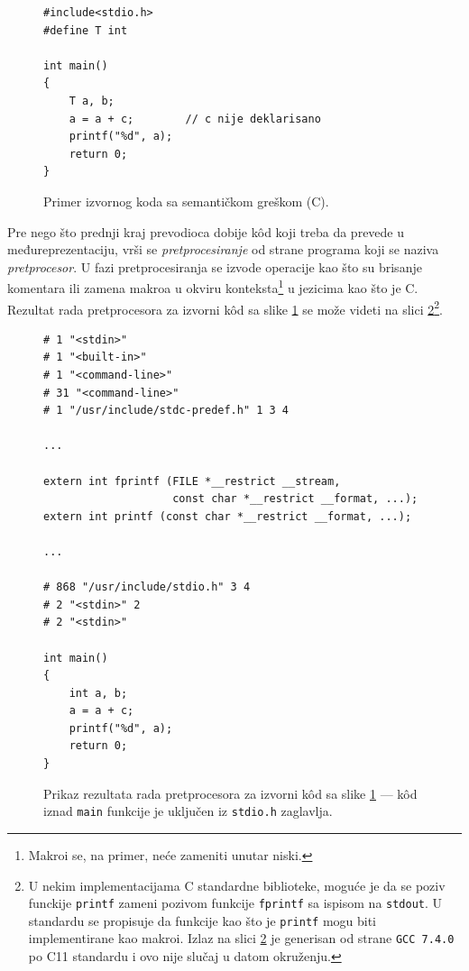 \begin{figure}[h!]
\begin{lstlisting}
#include<stdio.h>
#define T int

int main()
{
    T a, b;
    a = a + c;        // c nije deklarisano
    printf("%d", a);
    return 0;
}
\end{lstlisting}
\caption{Primer izvornog koda sa semantičkom greškom (C).}
\label{fig:CompilationProcessInit}
\end{figure}

Pre nego što prednji kraj prevodioca dobije k\^od koji treba da prevede u međureprezentaciju, vrši se \emph{pretprocesiranje} od strane programa koji se naziva \emph{pretprocesor}. U fazi pretprocesiranja se izvode operacije kao što su brisanje komentara ili zamena makroa u okviru konteksta\footnote{Makroi se, na primer, neće zameniti unutar niski.} u jezicima kao što je C. Rezultat rada pretprocesora za izvorni k\^od sa slike \ref{fig:CompilationProcessInit} se može videti na slici \ref{fig:CompilationProcessPrep}\footnote{U nekim implementacijama C standardne biblioteke, moguće je da se poziv funckije \texttt{printf} zameni pozivom funkcije \texttt{fprintf} sa ispisom na \texttt{stdout}. U standardu se propisuje da funkcije kao što je \texttt{printf} mogu biti implementirane kao makroi. Izlaz na slici \ref{fig:CompilationProcessPrep} je generisan od strane \texttt{GCC 7.4.0} po C11 standardu i ovo nije slučaj u datom okruženju.}.

\begin{figure}[h!]
\begin{lstlisting}[numbers=none]
# 1 "<stdin>"
# 1 "<built-in>"
# 1 "<command-line>"
# 31 "<command-line>"
# 1 "/usr/include/stdc-predef.h" 1 3 4

...

extern int fprintf (FILE *__restrict __stream, 
                    const char *__restrict __format, ...);
extern int printf (const char *__restrict __format, ...);

...

# 868 "/usr/include/stdio.h" 3 4
# 2 "<stdin>" 2
# 2 "<stdin>"

int main()
{
    int a, b;
    a = a + c;
    printf("%d", a);
    return 0;
}
\end{lstlisting}
\caption{Prikaz rezultata rada pretprocesora za izvorni k\^od sa slike \ref{fig:CompilationProcessInit} --- k\^od iznad \texttt{main} funkcije je uključen iz \texttt{stdio.h} zaglavlja.}
\label{fig:CompilationProcessPrep}
\end{figure}


